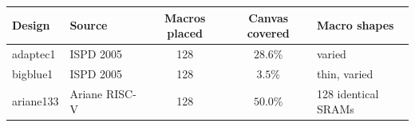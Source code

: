 \begin{tabular}{@{}llccl@{}}
\toprule
Design & Source & Macros placed & Canvas covered & Macro shapes \\
\midrule
adaptec1 & ISPD 2005~\citep{nam2005ispd} & 128 & $28.6$\% & varied \\
bigblue1 & ISPD 2005~\citep{nam2005ispd} & 128 & $3.5$\% & thin, varied \\
ariane133 & Ariane RISC-V~\citep{zaruba2019ariane,cheng2023assessment} & 128 & $50.0$\% & 128 identical SRAMs \\
\bottomrule
\end{tabular}
